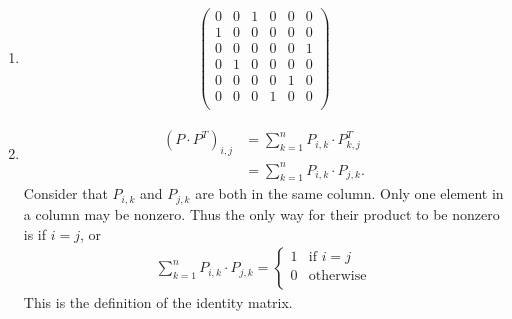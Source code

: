 \documentclass{article}
\begin{document}
\begin{enumerate}
    \item \phantom{} \begin{align*}
        \begin{pmatrix}
            0 & 0 & 1 & 0 & 0 & 0 \\
            1 & 0 & 0 & 0 & 0 & 0 \\
            0 & 0 & 0 & 0 & 0 & 1 \\
            0 & 1 & 0 & 0 & 0 & 0 \\
            0 & 0 & 0 & 0 & 1 & 0 \\
            0 & 0 & 0 & 1 & 0 & 0 \\
        \end{pmatrix}
    \end{align*}

    \item \begin{align*}
        (P \cdot P^T)_{i,j} &= \sum_{k = 1}^n P_{i, k} \cdot P^T_{k, j} \\
        &= \sum_{k = 1}^n P_{i, k} \cdot P_{j, k}.
    \end{align*}
    Consider that $P_{i, k}$ and $P_{j, k}$ are both in the same column. Only one element in a column may be nonzero. Thus the only way for their product to be nonzero is if $i = j$, or
    \begin{align*}
        \sum_{k = 1}^n P_{i, k} \cdot P_{j, k} = \begin{cases}
            1 & \text{if}\,\, i = j \\
            0 & \text{otherwise} \\
        \end{cases}
    \end{align*}
    This is the definition of the identity matrix.
\end{enumerate}
\end{document}
